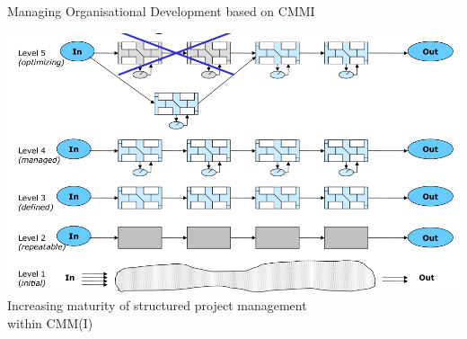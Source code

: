 \documentclass{beamer}
\begin{document}
\begin{frame}{Managing Organisational Development based on CMMI}
\begin{center}
  \includegraphics[width=\textwidth]{6.png}\\[1em] Increasing
  maturity of structured project management\\ within CMM(I)
\end{center}
\end{frame}
\end{document}
